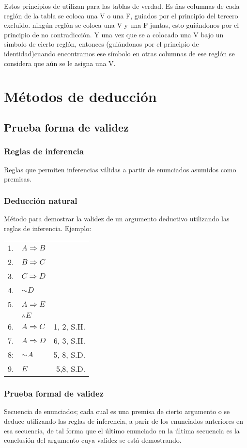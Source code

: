 \documentclass[10pt]{book} 						%
\begin{document}
Estos principios de utilizan para las tablas de verdad. Es ñas columnas de cada reglón de la tabla se coloca una V o una F, guiados por el principio del tercero excluido. ningún reglón se coloca una V y una F juntas, esto guiándonos por el principio de no contradicción. Y una vez que se a colocado una V bajo un símbolo de cierto reglón, entonces (guiándonos por el principio de identidad)cuando encontramos ese símbolo en otras columnas de ese reglón se considera que aún se le asigna una V. 

\section{Métodos de deducción}
\subsection{Prueba forma de validez}
\subsubsection{Reglas de inferencia}
Reglas que permiten inferencias válidas a partir de enunciados asumidos como premisas.
\subsubsection{Deducción natural}
Método para demostrar la validez de un argumento deductivo utilizando las reglas de inferencia.
Ejemplo:
\begin{center}
\begin{tabular}{r | l r}
1.&$A \Rightarrow B$&\\
2.&$B \Rightarrow C$&\\
3.&$C \Rightarrow D$&\\
4.&$\sim D$&\\
5.&$A \Rightarrow E$&\\
&$\therefore E $&\\
6.&$A \Rightarrow C$&1, 2, S.H.\\
7.&$A \Rightarrow D$&6, 3, S.H.\\
8:&$\sim A$&5, 8, S.D.\\
9.&$E$&5,8, S.D.\\
\end{tabular}
\end{center}
\subsubsection{Prueba formal de validez}
Secuencia de enunciados; cada cual es una premisa de cierto argumento o se deduce utilizando las reglas de inferencia, a parir de los enunciados anteriores en esa secuencia, de tal forma que el último enunciado en la última secuencia es la conclusión del argumento cuya validez se está demostrando.
\end{document}
